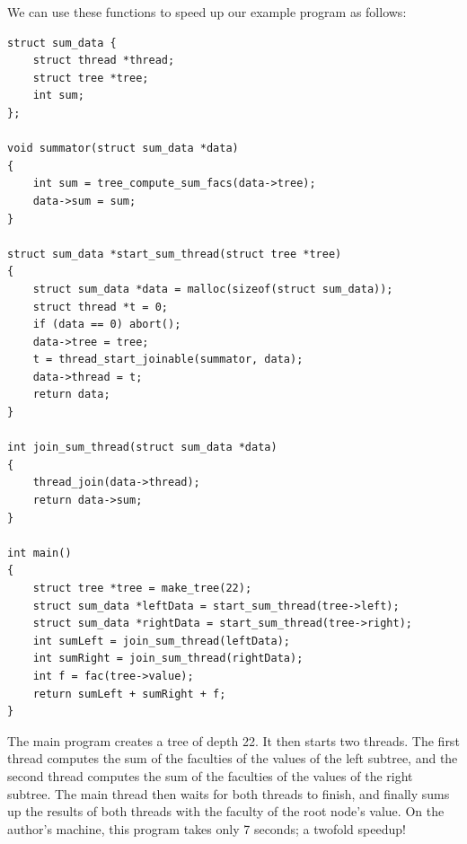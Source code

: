 \documentclass{article}
\begin{document}
We can use these functions to speed up our example program as
follows:
\begin{lstlisting}
struct sum_data {
    struct thread *thread;
    struct tree *tree;
    int sum;
};

void summator(struct sum_data *data)
{
    int sum = tree_compute_sum_facs(data->tree);
    data->sum = sum;
}

struct sum_data *start_sum_thread(struct tree *tree)
{
    struct sum_data *data = malloc(sizeof(struct sum_data));
    struct thread *t = 0;
    if (data == 0) abort();
    data->tree = tree;
    t = thread_start_joinable(summator, data);
    data->thread = t;
    return data;
}

int join_sum_thread(struct sum_data *data)
{
    thread_join(data->thread);
    return data->sum;
}

int main()
{
    struct tree *tree = make_tree(22);
    struct sum_data *leftData = start_sum_thread(tree->left);
    struct sum_data *rightData = start_sum_thread(tree->right);
    int sumLeft = join_sum_thread(leftData);
    int sumRight = join_sum_thread(rightData);
    int f = fac(tree->value);
    return sumLeft + sumRight + f;
}
\end{lstlisting}
The main program creates a tree of depth 22. It then starts two
threads. The first thread computes the sum of the faculties of
the values of the left subtree, and the second thread computes
the sum of the faculties of the values of the right subtree.
The main thread then waits for both threads to finish, and
finally sums up the results of both threads with the faculty of
the root node's value. On the author's machine, this program
takes only 7 seconds; a twofold speedup!
\end{document}
